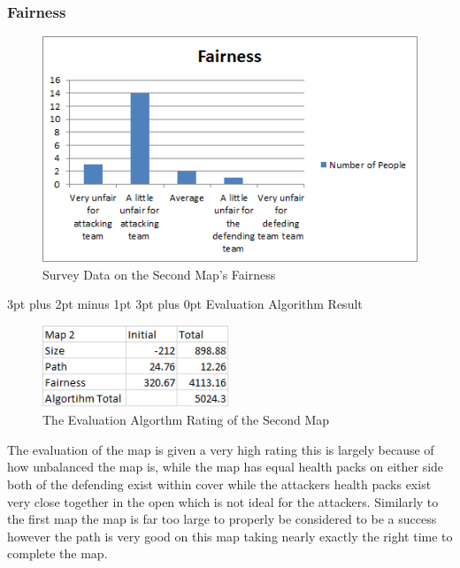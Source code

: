 \documentclass[12pt,a4paper,oneside]{book}
\makeatletter
\renewcommand\subsection{\@startsection {subsection}{1}{2mm} %
                               {3pt plus 2pt minus 1pt} %
                               {3pt plus 0pt} %
                               {\normalfont\bfseries}}
\makeatother
\begin{document}
\subsubsection{Fairness}
\begin{figure}[H]
	\includegraphics[width=1.0\textwidth]{images/Fair2.png}
	\caption{Survey Data on the Second Map's Fairness}
\end{figure}
\subsection{Evaluation Algorithm Result}
\begin{figure}[H]
	\includegraphics[width=0.5\textwidth]{images/a.png}
	\caption{The Evaluation Algorthm Rating of the Second Map}
\end{figure}
The evaluation of the map is given a very high rating this is largely because of how unbalanced the map is, while the map has equal health packs on either side both of the defending exist within cover while the attackers health packs exist very close together in the open which is not ideal for the attackers. Similarly to the first map the map is far too large to properly be considered to be a success however the path is very good on this map taking nearly exactly the right time to complete the map. 
\end{document}
